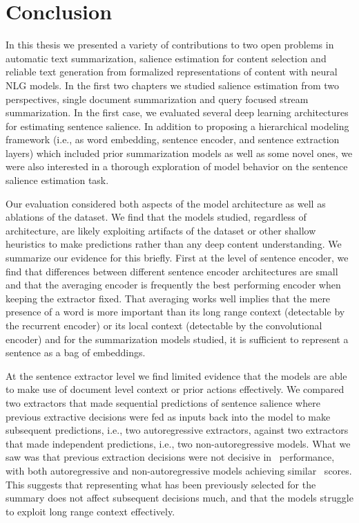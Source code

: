 \chapter{Conclusion}
\label{ch:conclusion}

\startglyph In this thesis we presented a variety of contributions to two open
problems in automatic text summarization, salience estimation for content
selection and reliable text generation from formalized representations of
content with neural NLG models.  In the first two chapters we studied salience
estimation from two perspectives, single document summarization and query
focused stream summarization. In the first case, we evaluated several deep
learning architectures for estimating sentence salience. In addition to
proposing a hierarchical modeling framework (i.e., as word embedding, sentence
encoder, and sentence extraction layers) which included prior summarization
models as well as some novel ones, we were also interested in a thorough
exploration of model behavior on the sentence salience estimation task.

Our evaluation considered both aspects of the model architecture as well as
ablations of the dataset. We find that the models studied, regardless of
architecture, are likely exploiting artifacts of the dataset or other shallow
heuristics to make predictions rather than any deep content understanding.  We
summarize our evidence for this briefly. First at the level of sentence
encoder, we find that differences between different sentence encoder
architectures are small and that the averaging encoder is frequently the best
performing encoder when keeping the extractor fixed. That averaging works well
implies that the mere presence of a word is more important than its long range
context (detectable by the recurrent encoder) or its local context (detectable
by the convolutional encoder) and for the summarization models studied, it is
sufficient to represent a sentence as a bag of embeddings. 

At the sentence extractor level we find limited evidence that the models are
able to make use of document level context or prior actions effectively.  We
compared two extractors that made sequential predictions of sentence salience
where previous extractive decisions were fed as inputs back into the model to
make subsequent predictions, i.e., two autoregressive extractors, against two
extractors that made independent predictions, i.e., two non-autoregressive
models. What we saw was that previous extraction decisions were not decisive in
\rouge~performance, with both autoregressive and non-autoregressive models
achieving similar \rouge~scores. This suggests that representing what has been
previously selected for the summary does not affect subsequent decisions much,
and that the models struggle to exploit long range context effectively.

